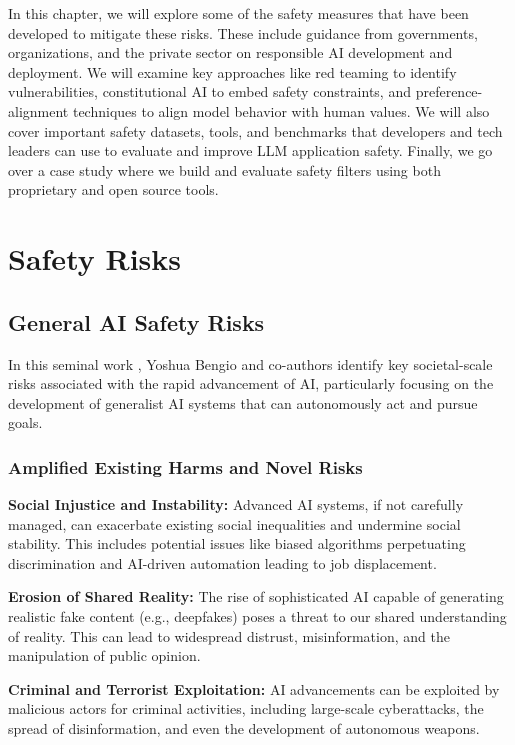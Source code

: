 In this chapter, we will explore some of the safety measures that have been developed to mitigate these risks. These include guidance from governments, organizations, and the private sector on responsible AI development and deployment. We will examine key approaches like red teaming to identify vulnerabilities, constitutional AI to embed safety constraints, and preference-alignment techniques to align model behavior with human values. We will also cover important safety datasets, tools, and benchmarks that developers and tech leaders can use to evaluate and improve LLM application safety. Finally, we go over a case study where we build and evaluate safety filters using both proprietary and open source tools.

\section{Safety Risks}

\subsection{General AI Safety Risks}

In this seminal work , Yoshua Bengio and co-authors identify key societal-scale risks associated with the rapid advancement of AI, particularly focusing on the development of generalist AI systems that can autonomously act and pursue goals.

\subsubsection{Amplified Existing Harms and Novel Risks}

\textbf{Social Injustice and Instability:} Advanced AI systems, if not carefully managed, can exacerbate existing social inequalities and undermine social stability. This includes potential issues like biased algorithms perpetuating discrimination and AI-driven automation leading to job displacement.

\textbf{Erosion of Shared Reality:} The rise of sophisticated AI capable of generating realistic fake content (e.g., deepfakes) poses a threat to our shared understanding of reality. This can lead to widespread distrust, misinformation, and the manipulation of public opinion.

\textbf{Criminal and Terrorist Exploitation:} AI advancements can be exploited by malicious actors for criminal activities, including large-scale cyberattacks, the spread of disinformation, and even the development of autonomous weapons.

